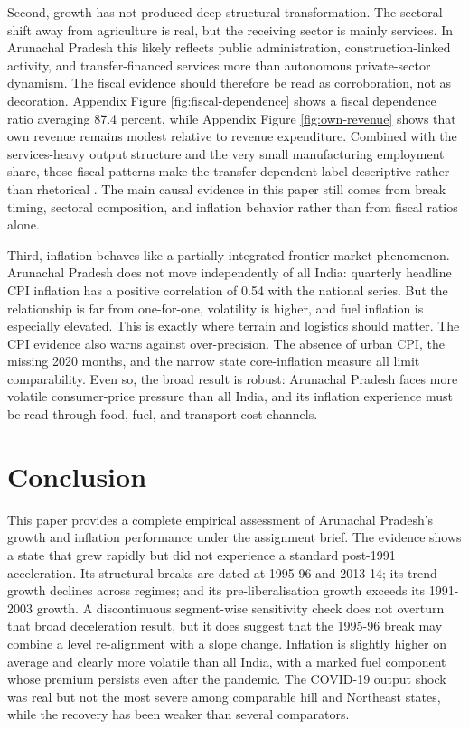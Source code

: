\documentclass[11pt,a4paper]{article}
\begin{document}
Second, growth has not produced deep structural transformation. The sectoral shift away from agriculture is real, but the receiving sector is mainly services. In Arunachal Pradesh this likely reflects public administration, construction-linked activity, and transfer-financed services more than autonomous private-sector dynamism. The fiscal evidence should therefore be read as corroboration, not as decoration. Appendix Figure \ref{fig:fiscal-dependence} shows a fiscal dependence ratio averaging 87.4 percent, while Appendix Figure \ref{fig:own-revenue} shows that own revenue remains modest relative to revenue expenditure. Combined with the services-heavy output structure and the very small manufacturing employment share, those fiscal patterns make the transfer-dependent label descriptive rather than rhetorical \citep{govil_chauhan_2024,niti_ncaer_2025_arunachal}. The main causal evidence in this paper still comes from break timing, sectoral composition, and inflation behavior rather than from fiscal ratios alone.

Third, inflation behaves like a partially integrated frontier-market phenomenon. Arunachal Pradesh does not move independently of all India: quarterly headline CPI inflation has a positive correlation of 0.54 with the national series. But the relationship is far from one-for-one, volatility is higher, and fuel inflation is especially elevated. This is exactly where terrain and logistics should matter. The CPI evidence also warns against over-precision. The absence of urban CPI, the missing 2020 months, and the narrow state core-inflation measure all limit comparability. Even so, the broad result is robust: Arunachal Pradesh faces more volatile consumer-price pressure than all India, and its inflation experience must be read through food, fuel, and transport-cost channels.

\section{Conclusion}

This paper provides a complete empirical assessment of Arunachal Pradesh's growth and inflation performance under the assignment brief. The evidence shows a state that grew rapidly but did not experience a standard post-1991 acceleration. Its structural breaks are dated at 1995-96 and 2013-14; its trend growth declines across regimes; and its pre-liberalisation growth exceeds its 1991-2003 growth. A discontinuous segment-wise sensitivity check does not overturn that broad deceleration result, but it does suggest that the 1995-96 break may combine a level re-alignment with a slope change. Inflation is slightly higher on average and clearly more volatile than all India, with a marked fuel component whose premium persists even after the pandemic. The COVID-19 output shock was real but not the most severe among comparable hill and Northeast states, while the recovery has been weaker than several comparators.
\end{document}
